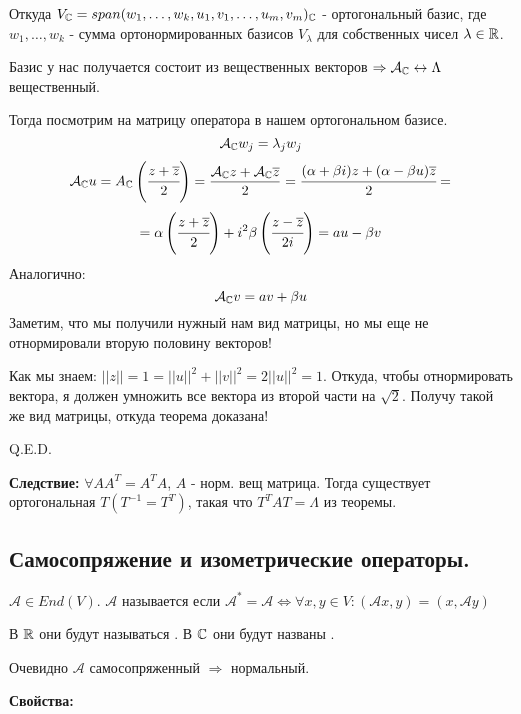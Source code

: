 Откуда $V_{\mathbb{C}} = span(w_1,\ldots,w_k, u_1,v_1,\ldots,u_m,v_m)_{\mathbb{C}}$ - ортогональный базис, где $w_1,\ldots, w_k$ - сумма ортонормированных базисов $V_\lambda$ для собственных чисел $\lambda \in \mathbb{R}$.

Базис у нас получается состоит из вещественных векторов $\Rightarrow \mathcal{A}_{\mathbb{C}}\leftrightarrow \Lambda$ вещественный.

Тогда посмотрим на матрицу оператора в нашем ортогональном базисе.
$$\mathcal{A}_{\mathbb{C}} w_j = \lambda_j w_j$$
$$ \mathcal{A}_{\mathbb{C}} u = A_{\mathbb{C}} \left(\cfrac{z + \overline{z}}{2}\right) = \frac{ \mathcal{A}_{\mathbb{C}} z +  \mathcal{A}_{\mathbb{C}} \overline{z}}{2} = \cfrac{(\alpha + \beta i)z + (\alpha - \beta u)\overline{z}}{2} =$$
$$=\alpha \left(\cfrac{z+\overline{z}}{2}\right) + i^2 \beta \left(\cfrac{z-\overline{z}}{2i}\right)  = au - \beta v$$
Аналогично:
$$\mathcal{A}_{\mathbb{C}} v = av + \beta u$$
Заметим, что мы получили нужный нам вид матрицы, но мы еще не отнормировали вторую половину векторов!

Как мы знаем: $||z|| = 1 =||u||^2 + ||v ||^2 = 2 ||u||^2 = 1$. Откуда, чтобы отнормировать вектора, я должен умножить все вектора из второй части на $\sqrt{2}$. Получу такой же вид матрицы, откуда теорема доказана!

\hfill Q.E.D.

\textbf{Следствие:} $\forall AA^T =A^T A$, $A$ - норм. вещ матрица. Тогда существует ортогональная $T (T^{-1}=T^T)$, такая что $T^TAT = \Lambda$ из теоремы.






\newpage
\subsection{Самосопряжение и изометрические операторы.}


 $\mathcal{A}\in End(V)$. $\mathcal{A}$ называется  если $\mathcal{A}^* =\mathcal{A} \Leftrightarrow \forall x,y \in V: (\mathcal{A}x,y) = (x,\mathcal{A}y) $

В $\mathbb{R}$ они будут называться . В $\mathbb{C}$ они будут названы .

Очевидно $\mathcal{A}$ самосопряженный $\Rightarrow$ нормальный.

\textbf{Свойства:}

